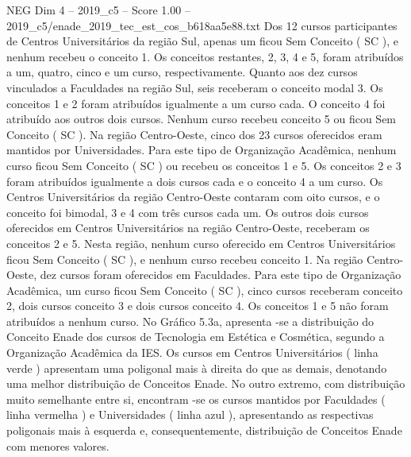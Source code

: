 \begin{textsample}{NEG Dim 4 – 2019\_c5 – Score 1.00 – 2019\_c5/enade\_2019\_tec\_est\_cos\_b618aa5e88.txt}
Dos 12 cursos participantes de Centros Universitários da região Sul, apenas um ficou Sem Conceito ( SC ), e nenhum recebeu o conceito 1.
Os conceitos restantes, 2, 3, 4 e 5, foram atribuídos a um, quatro, cinco e um curso, respectivamente.
Quanto aos dez cursos vinculados a Faculdades na região Sul, seis receberam o conceito modal 3.
Os conceitos 1 e 2 foram atribuídos igualmente a um curso cada.
O conceito 4 foi atribuído aos outros dois cursos.
Nenhum curso recebeu conceito 5 ou ficou Sem Conceito ( SC ).
Na região Centro-Oeste, cinco dos 23 cursos oferecidos eram mantidos por Universidades.
Para este tipo de Organização Acadêmica, nenhum curso ficou Sem Conceito ( SC ) ou recebeu os conceitos 1 e 5.
Os conceitos 2 e 3 foram atribuídos igualmente a dois cursos cada e o conceito 4 a um curso.
Os Centros Universitários da região Centro-Oeste contaram com oito cursos, e o conceito foi bimodal, 3 e 4 com três cursos cada um.
Os outros dois cursos oferecidos em Centros Universitários na região Centro-Oeste, receberam os conceitos 2 e 5.
Nesta região, nenhum curso oferecido em Centros Universitários ficou Sem Conceito ( SC ), e nenhum curso recebeu conceito 1.
Na região Centro-Oeste, dez cursos foram oferecidos em Faculdades.
Para este tipo de Organização Acadêmica, um curso ficou Sem Conceito ( SC ), cinco cursos receberam conceito 2, dois cursos conceito 3 e dois cursos conceito 4.
Os conceitos 1 e 5 não foram atribuídos a nenhum curso.
No Gráfico 5.3a, apresenta -se a distribuição do Conceito Enade dos cursos de Tecnologia em Estética e Cosmética, segundo a Organização Acadêmica da IES.
Os cursos em Centros Universitários ( linha verde ) apresentam uma poligonal mais à direita do que as demais, denotando uma melhor distribuição de Conceitos Enade.
No outro extremo, com distribuição muito semelhante entre si, encontram -se os cursos mantidos por Faculdades ( linha vermelha ) e Universidades ( linha azul ), apresentando as respectivas poligonais mais à esquerda e, consequentemente, distribuição de Conceitos Enade com menores valores.

\end{textsample}
